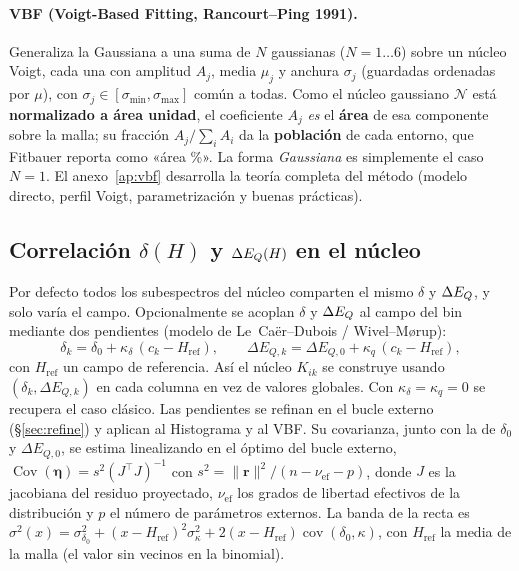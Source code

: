\paragraph{VBF (Voigt-Based Fitting, Rancourt--Ping 1991).} Generaliza la
Gaussiana a una suma de $N$ gaussianas ($N=1\ldots6$) sobre un núcleo Voigt, cada
una con amplitud $A_j$, media $\mu_j$ y anchura $\sigma_j$ (guardadas ordenadas por
$\mu$), con $\sigma_j\in[\sigma_{\min},\sigma_{\max}]$ común a todas. Como el núcleo gaussiano $\mathcal N$ está \textbf{normalizado a área
unidad}, el coeficiente $A_j$ \emph{es} el \textbf{área} de esa componente sobre
la malla; su fracción $A_j/\sum_i A_i$ da la \textbf{población} de cada entorno,
que Fitbauer reporta como «área \%». La forma \emph{Gaussiana} es simplemente el
caso $N=1$. El anexo~\ref{ap:vbf} desarrolla la teoría completa del método (modelo
directo, perfil Voigt, parametrización y buenas prácticas).

\subsection{Correlación \texorpdfstring{$\delta(H)$}{d(H)} y \texorpdfstring{$\Delta E_{Q}(H)$}{DEQ(H)} en el núcleo}\label{sec:dist-corr}
Por defecto todos los subespectros del núcleo comparten el mismo $\delta$ y
$\Delta E_{Q}$, y solo varía el campo. Opcionalmente se acoplan $\delta$ y $\Delta E_{Q}$ al campo
del bin mediante dos pendientes (modelo de Le~Caër--Dubois / Wivel--M\o{}rup):
\begin{equation}
  \delta_k = \delta_0 + \kappa_\delta\,(c_k-H_{\text{ref}}),\qquad
  \Delta E_{Q,k} = \Delta E_{Q,0} + \kappa_q\,(c_k-H_{\text{ref}}),
\end{equation}
con $H_{\text{ref}}$ un campo de referencia. Así el núcleo $K_{ik}$ se construye
usando $(\delta_k,\Delta E_{Q,k})$ en cada columna en vez de valores globales. Con
$\kappa_\delta=\kappa_q=0$ se recupera el caso clásico. Las pendientes se refinan
en el bucle externo (\S\ref{sec:refine}) y aplican al Histograma y al VBF.
Su covarianza, junto con la de $\delta_0$ y $\Delta E_{Q,0}$, se estima
linealizando en el óptimo del bucle externo,
$\operatorname{Cov}(\bm\eta)=s^2(J^\top J)^{-1}$ con
$s^2=\|\bm r\|^2/(n-\nu_{\text{ef}}-p)$, donde $J$ es la jacobiana del residuo
proyectado, $\nu_{\text{ef}}$ los grados de libertad efectivos de la distribución
y $p$ el número de parámetros externos. La banda de la recta es
$\sigma^2(x)=\sigma^2_{\delta_0}+(x-H_{\text{ref}})^2\sigma^2_{\kappa}
+2(x-H_{\text{ref}})\operatorname{cov}(\delta_0,\kappa)$, con
$H_{\text{ref}}$ la media de la malla (el valor sin vecinos en la binomial).

